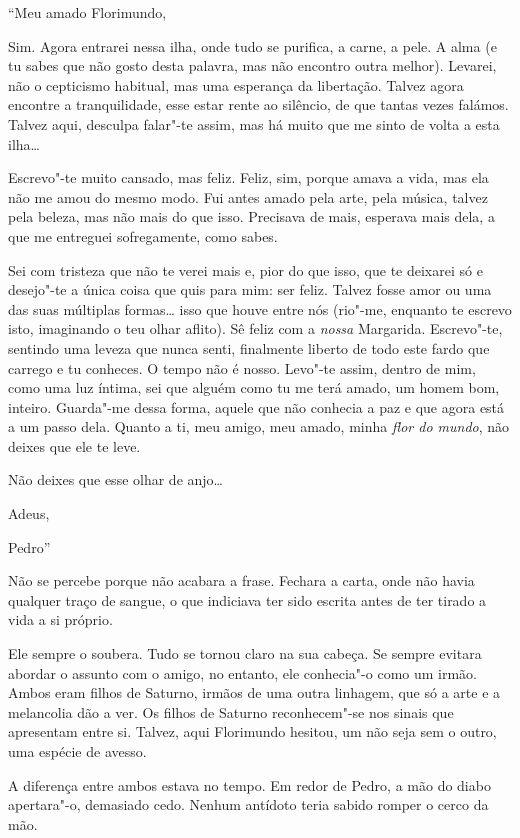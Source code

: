 ``Meu amado Florimundo,

Sim. Agora entrarei nessa ilha, onde tudo se purifica, a carne, a pele.
A alma (e tu sabes que não gosto desta palavra, mas não encontro outra
melhor). Levarei, não o cepticismo habitual, mas uma esperança da
libertação. Talvez agora encontre a tranquilidade, esse estar rente ao
silêncio, de que tantas vezes falámos. Talvez aqui, desculpa falar"-te
assim, mas há muito que me sinto de volta a esta ilha\ldots{}

Escrevo"-te muito cansado, mas feliz. Feliz, sim, porque amava a vida,
mas ela não me amou do mesmo modo. Fui antes amado pela arte, pela
música, talvez pela beleza, mas não mais do que isso. Precisava de mais,
esperava mais dela, a que me entreguei sofregamente, como sabes.

Sei com tristeza que não te verei mais e, pior do que isso, que te
deixarei só e desejo"-te a única coisa que quis para mim: ser feliz.
Talvez fosse amor ou uma das suas múltiplas formas\ldots{} isso que houve
entre nós (rio"-me, enquanto te escrevo isto, imaginando o teu olhar
aflito). Sê feliz com a \emph{nossa} Margarida. Escrevo"-te, sentindo uma
leveza que nunca senti, finalmente liberto de todo este fardo que
carrego e tu conheces. O tempo não é nosso. Levo"-te assim, dentro de
mim, como uma luz íntima, sei que alguém como tu me terá amado, um homem
bom, inteiro. Guarda"-me dessa forma, aquele que não conhecia a paz e que
agora está a um passo dela. Quanto a ti, meu amigo, meu amado, minha
\emph{flor do mundo}, não deixes que ele te leve.

Não deixes que esse olhar de anjo\ldots{}

Adeus,

Pedro''

Não se percebe porque não acabara a frase. Fechara a carta, onde não
havia qualquer traço de sangue, o que indiciava ter sido escrita antes
de ter tirado a vida a si próprio.

Ele sempre o soubera. Tudo se tornou claro na sua cabeça. Se sempre
evitara abordar o assunto com o amigo, no entanto, ele conhecia"-o como
um irmão. Ambos eram filhos de Saturno, irmãos de uma outra linhagem,
que só a arte e a melancolia dão a ver. Os filhos de Saturno
reconhecem"-se nos sinais que apresentam entre si. Talvez, aqui
Florimundo hesitou, um não seja sem o outro, uma espécie de avesso.

A diferença entre ambos estava no tempo. Em redor de Pedro, a mão do
diabo apertara"-o, demasiado cedo. Nenhum antídoto teria sabido romper o
cerco da mão.

